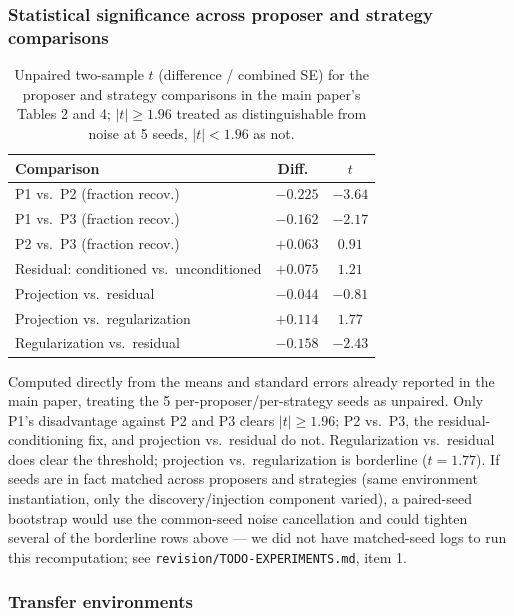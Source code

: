 \documentclass[11pt]{article}
\theoremstyle{plain}
\theoremstyle{definition}
\theoremstyle{remark}
\begin{document}
\subsubsection{Statistical significance across proposer and strategy comparisons}

\begin{table}[h]
\centering\small
\caption{Unpaired two-sample $t$ (difference / combined SE) for the proposer and strategy comparisons in the main paper's Tables 2 and 4; $|t|\ge1.96$ treated as distinguishable from noise at 5 seeds, $|t|<1.96$ as not.}
\label{tab:significance}
\begin{tabular}{@{}lcc@{}}
\toprule
Comparison & Diff.\ & $t$ \\
\midrule
P1 vs.\ P2 (fraction recov.) & $-0.225$ & $-3.64$ \\
P1 vs.\ P3 (fraction recov.) & $-0.162$ & $-2.17$ \\
P2 vs.\ P3 (fraction recov.) & $+0.063$ & $0.91$ \\
Residual: conditioned vs.\ unconditioned & $+0.075$ & $1.21$ \\
Projection vs.\ residual & $-0.044$ & $-0.81$ \\
Projection vs.\ regularization & $+0.114$ & $1.77$ \\
Regularization vs.\ residual & $-0.158$ & $-2.43$ \\
\bottomrule
\end{tabular}
\end{table}

Computed directly from the means and standard errors already reported in the main paper, treating the 5 per-proposer/per-strategy seeds as unpaired. Only P1's disadvantage against P2 and P3 clears $|t|\ge1.96$; P2 vs.\ P3, the residual-conditioning fix, and projection vs.\ residual do not. Regularization vs.\ residual does clear the threshold; projection vs.\ regularization is borderline ($t=1.77$). If seeds are in fact matched across proposers and strategies (same environment instantiation, only the discovery/injection component varied), a paired-seed bootstrap would use the common-seed noise cancellation and could tighten several of the borderline rows above --- we did not have matched-seed logs to run this recomputation; see \texttt{revision/TODO-EXPERIMENTS.md}, item 1.

\subsubsection{Transfer environments}
\end{document}
